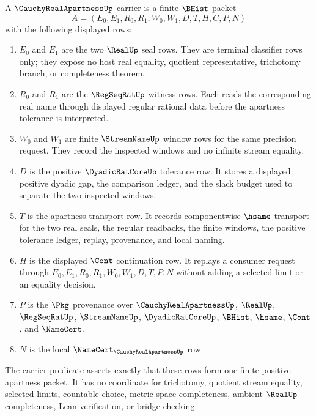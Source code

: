 \begin{definition}
\label{def:cauchy-real-apartness-carrier}
A $\CauchyRealApartnessUp$ carrier is a finite $\BHist$ packet
$$
A=(E_0,E_1,R_0,R_1,W_0,W_1,D,T,H,C,P,N)
$$
with the following displayed rows:
\begin{enumerate}
\item $E_0$ and $E_1$ are the two $\RealUp$ seal rows. They are terminal classifier rows only; they expose no host real equality, quotient representative, trichotomy branch, or completeness theorem.
\item $R_0$ and $R_1$ are the $\RegSeqRatUp$ witness rows. Each reads the corresponding real name through displayed regular rational data before the apartness tolerance is interpreted.
\item $W_0$ and $W_1$ are finite $\StreamNameUp$ window rows for the same precision request. They record the inspected windows and no infinite stream equality.
\item $D$ is the positive $\DyadicRatCoreUp$ tolerance row. It stores a displayed positive dyadic gap, the comparison ledger, and the slack budget used to separate the two inspected windows.
\item $T$ is the apartness transport row. It records componentwise $\hsame$ transport for the two real seals, the regular readbacks, the finite windows, the positive tolerance ledger, replay, provenance, and local naming.
\item $H$ is the displayed $\Cont$ continuation row. It replays a consumer request through $E_0,E_1,R_0,R_1,W_0,W_1,D,T,P,N$ without adding a selected limit or an equality decision.
\item $P$ is the $\Pkg$ provenance over $\CauchyRealApartnessUp$, $\RealUp$, $\RegSeqRatUp$, $\StreamNameUp$, $\DyadicRatCoreUp$, $\BHist$, $\hsame$, $\Cont$, and $\NameCert$.
\item $N$ is the local $\NameCert_{\CauchyRealApartnessUp}$ row.
\end{enumerate}
The carrier predicate asserts exactly that these rows form one finite positive-apartness packet. It has no coordinate for trichotomy, quotient stream equality, selected limits, countable choice, metric-space completeness, ambient $\RealUp$ completeness, Lean verification, or bridge checking.
\end{definition}

